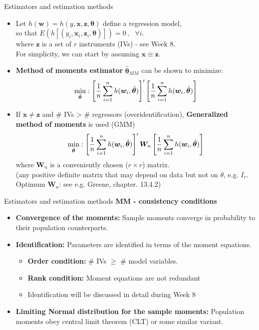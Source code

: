 \documentclass{beamer}
\begin{document}
\begin{frame}{Estimators and estimation methods}
\begin{itemize}
    \item Let $h (\bm{w}) = h(y,\bm{x}, \bm{z}, \bm{\theta})$ define a regression model,
    \\so that $ E (h [( y_i, \bm{x}_i, \bm{z}_i, \bm{\theta} )]) = 0 \, , ~~~ \forall i.$ 
    \\where $\bm{z}$ is a set of $r$ instruments (IVs) - see Week 8.
    \\For simplicity, we can start by assuming  $\bm{x} \equiv \bm{z}$.
    \item \textbf{Method of moments estimator} $\hat{\bm{\theta}}_{\textit{MM}}$ can be shown to minimize:
    $$
    \underset{\hat{\bm{\theta}}}{\textnormal{min}}:
    \left[ \frac{1}{n} \sum_{i=1}^n h (\bm{w}_i,\hat{\bm{\theta}} )
    \right]^{\prime}
    \left[ \frac{1}{n} \sum_{i=1}^n h (\bm{w}_i,\hat{\bm{\theta}} )
    \right]
    $$
    \item If $\bm{x} \neq \bm{z}$ and \# IVs > \# regressors (overidentification), \textbf{Generalized method of moments} is used (GMM)
    $$
    \underset{\hat{\bm{\theta}}}{\textnormal{min}}:
    \left[ \frac{1}{n} \sum_{i=1}^n h (\bm{w}_i,\hat{\bm{\theta}} )
    \right]^{\prime} \bm{W}_n
    \left[ \frac{1}{n} \sum_{i=1}^n h (\bm{w}_i,\hat{\bm{\theta}} )
    \right]
    $$
    where $\bm{W}_n$ is a conveniently chosen ($r \times r$) matrix. 
    \\ \small{(any positive definite matrix that may depend on data but not on $\theta$, e.g. $I_r$. Optimum $\bm{W}_n$: see e.g. Greene, chapter. 13.4.2)}
\end{itemize}
\end{frame}
\begin{frame}{Estimators and estimation methods}
\textbf{MM - consistency conditions}\\
\medskip
\begin{itemize}
  \item \textbf{Convergence of the moments:} Sample moments converge in probability to their population counterparts.
  \medskip
  \item \textbf{Identification:} Parameters are identified in terms of the moment equations.
  \begin{itemize}
      \item \textbf{Order condition:} \# IVs $\geq$ \# model variables.
      \item \textbf{Rank condition:} Moment equations are not redundant
      \item Identification will be discussed in detail during Week 8
  \end{itemize}
  \medskip
  \item \textbf{Limiting Normal distribution for the sample moments:} Population moments obey central limit theorem (CLT) or some similar variant.
\end{itemize}
\end{frame}
\end{document}
